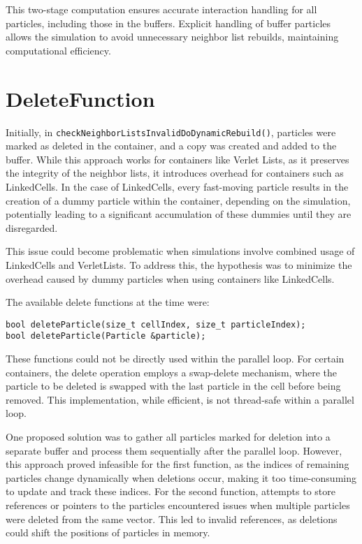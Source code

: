 This two-stage computation ensures accurate interaction handling for all particles, including those in the buffers. Explicit handling of buffer particles allows the simulation to avoid unnecessary neighbor list rebuilds, maintaining computational efficiency.

\section{DeleteFunction}
Initially, in \texttt{checkNeighborListsInvalidDoDynamicRebuild()}, particles were marked as deleted in the container, and a copy was created and added to the buffer. While this approach works for containers like Verlet Lists, as it preserves the integrity of the neighbor lists, it introduces overhead for containers such as LinkedCells. In the case of LinkedCells, every fast-moving particle results in the creation of a dummy particle within the container, depending on the simulation, potentially leading to a significant accumulation of these dummies until they are disregarded. 

This issue could become problematic when simulations involve combined usage of LinkedCells and VerletLists. To address this, the hypothesis was to minimize the overhead caused by dummy particles when using containers like LinkedCells.

The available delete functions at the time were:
\begin{lstlisting}[style=cppstyle]
bool deleteParticle(size_t cellIndex, size_t particleIndex);
bool deleteParticle(Particle &particle);
\end{lstlisting}

These functions could not be directly used within the parallel loop. For certain containers, the delete operation employs a swap-delete mechanism, where the particle to be deleted is swapped with the last particle in the cell before being removed. This implementation, while efficient, is not thread-safe within a parallel loop.

One proposed solution was to gather all particles marked for deletion into a separate buffer and process them sequentially after the parallel loop. However, this approach proved infeasible for the first function, as the indices of remaining particles change dynamically when deletions occur, making it too time-consuming to update and track these indices. For the second function, attempts to store references or pointers to the particles encountered issues when multiple particles were deleted from the same vector. This led to invalid references, as deletions could shift the positions of particles in memory.

